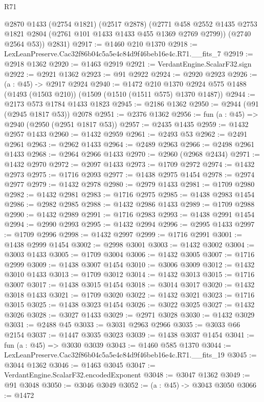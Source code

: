 \begin{lexlean}{R71}
\begin{coremodule}
        @2870
        @1433
        (@2754 @1821)
        (@2517 @2878)
        (@2771 @458 @2552 @1435 @2753 @1821 @2804 (@2761 @101 @1433 @1433 @455 @1369 @2769 @2799))
        (@2740 @2564 @53))
      @2831)
@2917 := @1460 @210 @1370
@2918 := LexLeanPreserve.Cac32f86b04c5a5e4c84d9f46beb16e4c.R71.__fits_7
@2919 := @2918 @1362
@2920 := @1463 @2919
@2921 := VerdantEngine.ScalarF32.sign
@2922 := @2921 @1362
@2923 := @91 @2922
@2924 := @2920 @2923
@2926 := (a : @45) -> @2917 @2924
@2940 := @1472
    @210
    @1370
    @2924
    @575
    @1488
    (@1493 (@1503 @210))
    (@1509 (@1510 (@1511 @575) @1370 @1487))
@2944 := @2173 @573 @1784 @1433 @1823
@2945 := @2186 @1362
@2950 := @2944 (@91 (@2945 @1817 @53)) @2078
@2951 := @2376 @1362
@2956 := fun (a : @45) => @2940 (@2950 (@2951 @1817 @53))
@2957 := @2435 @1435
@2959 := @1432 @2957 @1433
@2960 := @1432 @2959
@2961 := @2493 @53
@2962 := @2491 @2961
@2963 := @2962 @1433
@2964 := @2489 @2963
@2966 := @2498 @2961 @1433
@2968 := @2964 @2966 @1433
@2970 := @2960 (@2968 @2434)
@2971 := @1432 @2970
@2972 := @2097 @1433
@2973 := @1709 @2972
@2974 := @1432 @2973
@2975 := @1716 @2093
@2977 := @1438 @2975 @1454
@2978 := @2974 @2977
@2979 := @1432 @2978
@2980 := @2979 @1433
@2981 := @1709 @2980
@2982 := @1432 @2981
@2983 := @1716 @2975
@2985 := @1438 @2983 @1454
@2986 := @2982 @2985
@2988 := @1432 @2986 @1433
@2989 := @1709 @2988
@2990 := @1432 @2989
@2991 := @1716 @2983
@2993 := @1438 @2991 @1454
@2994 := @2990 @2993
@2995 := @1432 @2994
@2996 := @2995 @1433
@2997 := @1709 @2996
@2998 := @1432 @2997
@2999 := @1716 @2991
@3001 := @1438 @2999 @1454
@3002 := @2998 @3001
@3003 := @1432 @3002
@3004 := @3003 @1433
@3005 := @1709 @3004
@3006 := @1432 @3005
@3007 := @1716 @2999
@3009 := @1438 @3007 @1454
@3010 := @3006 @3009
@3012 := @1432 @3010 @1433
@3013 := @1709 @3012
@3014 := @1432 @3013
@3015 := @1716 @3007
@3017 := @1438 @3015 @1454
@3018 := @3014 @3017
@3020 := @1432 @3018 @1433
@3021 := @1709 @3020
@3022 := @1432 @3021
@3023 := @1716 @3015
@3025 := @1438 @3023 @1454
@3026 := @3022 @3025
@3027 := @1432 @3026
@3028 := @3027 @1433
@3029 := @2971 @3028
@3030 := @1432 @3029
@3031 := @2488 @45
@3033 := @3031 @2963 @2966
@3035 := @3033 @66 @2154
@3037 := @1447 @3035 @3023
@3039 := @1438 @3037 @1454
@3041 := fun (a : @45) => @3030 @3039
@3043 := @1460 @585 @1370
@3044 := LexLeanPreserve.Cac32f86b04c5a5e4c84d9f46beb16e4c.R71.__fits_19
@3045 := @3044 @1362
@3046 := @1463 @3045
@3047 := VerdantEngine.ScalarF32.encodedExponent
@3048 := @3047 @1362
@3049 := @91 @3048
@3050 := @3046 @3049
@3052 := (a : @45) -> @3043 @3050
@3066 := @1472

\end{coremodule}
\end{lexlean}
